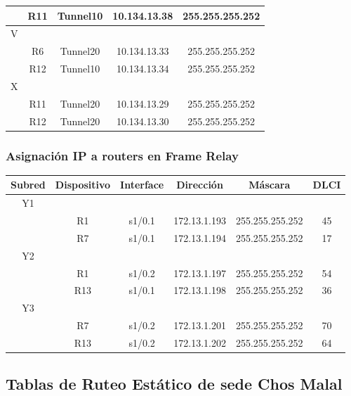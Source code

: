 \documentclass[12pt, a4paper, spanish]{article}
\begin{document}
\begin{center}
\begin{tabular}{|c|c|c|c|c|}
	\hline
	 & R11 		& Tunnel10 & 10.134.13.38 & 255.255.255.252 \\
	\hline
	\hline
	V & & & & \\
	\hline
	 & R6 		& Tunnel20 & 10.134.13.33 & 255.255.255.252 \\
	\hline
	 & R12 		& Tunnel10 & 10.134.13.34 & 255.255.255.252 \\
	\hline
	\hline
	X & & & & \\
	\hline
	 & R11 		& Tunnel20 & 10.134.13.29 & 255.255.255.252 \\
	\hline
	 & R12 		& Tunnel20 & 10.134.13.30 & 255.255.255.252 \\
	\hline
\end{tabular}
\end{center}

\subsubsection{Asignación IP a routers en Frame Relay}
\begin{center}
\begin{tabular}{|c|c|c|c|c|c|}
	\hline
	Subred & Dispositivo & Interface & Dirección & Máscara & DLCI \\
	\hline	
	\hline
	Y1 & & & & & \\
	\hline
	 & R1 	& s1/0.1 & 172.13.1.193 & 255.255.255.252 & 45 \\
	\hline
	 & R7 	& s1/0.1 & 172.13.1.194 & 255.255.255.252 & 17 \\
	\hline
	\hline
	Y2 & & & & & \\
	\hline
	 & R1 	& s1/0.2 & 172.13.1.197 & 255.255.255.252 & 54 \\
	\hline
	 & R13 	& s1/0.1 & 172.13.1.198 & 255.255.255.252 & 36 \\
	\hline
	\hline
	Y3 & & & & & \\
	\hline
	 & R7 	& s1/0.2 & 172.13.1.201 & 255.255.255.252 & 70 \\
	\hline
	 & R13 	& s1/0.2 & 172.13.1.202 & 255.255.255.252 & 64 \\
	\hline 
\end{tabular}
\end{center}


\subsection{Tablas de Ruteo Estático de sede Chos Malal}
\end{document}
